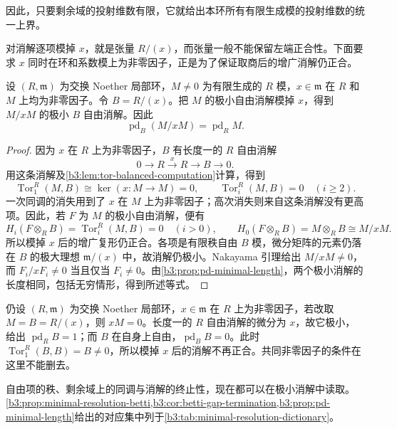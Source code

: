 因此，只要剩余域的投射维数有限，它就给出本环所有有限生成模的投射维数的统一上界。

\ProseParagraphBreak
对消解逐项模掉 \(x\)，就是张量 \(R/(x)\)，而张量一般不能保留左端正合性。下面要求 \(x\) 同时在环和系数模上为非零因子，正是为了保证取商后的增广消解仍正合。

\begin{lemma}\label{b3:lem:regular-element-resolution-basechange}
	设 \((R,\mathfrak m)\) 为交换 Noether 局部环，\(M\ne0\) 为有限生成的 \(R\) 模，\(x\in\mathfrak m\) 在 \(R\) 和 \(M\) 上均为非零因子。令 \(B=R/(x)\)。把 \(M\) 的极小自由消解模掉 \(x\)，得到 \(M/xM\) 的极小 \(B\) 自由消解。因此
	\[
		\operatorname{pd}_B(M/xM)=\operatorname{pd}_RM.
	\]
\end{lemma}
\begin{proof}
	因为 \(x\) 在 \(R\) 上为非零因子，\(B\) 有长度一的 \(R\) 自由消解
	\[
		0\longrightarrow R\xrightarrow{x}R\longrightarrow B\longrightarrow0.
	\]
	用这条消解及\cref{b3:lem:tor-balanced-computation}计算，得到
	\[
		\operatorname{Tor}_1^R(M,B)\cong\ker(x:M\rightarrow M)=0, \qquad \operatorname{Tor}_i^R(M,B)=0\quad(i\ge2).
	\]
	一次同调的消失用到了 \(x\) 在 \(M\) 上为非零因子；高次消失则来自这条消解没有更高项。因此，若 \(F\) 为 \(M\) 的极小自由消解，便有
	\[
		H_i(F\otimes_RB)=\operatorname{Tor}_i^R(M,B)=0\quad(i>0), \qquad H_0(F\otimes_RB)=M\otimes_RB\cong M/xM.
	\]
	所以模掉 \(x\) 后的增广复形仍正合。各项是有限秩自由 \(B\) 模，微分矩阵的元素仍落在 \(B\) 的极大理想 \(\mathfrak m/(x)\) 中，故消解仍极小。Nakayama 引理给出 \(M/xM\ne0\)，而 \(F_i/xF_i\ne0\) 当且仅当 \(F_i\ne0\)。由\cref{b3:prop:pd-minimal-length}，两个极小消解的长度相同，包括无穷情形，得到所述等式。
\end{proof}

仍设 \((R,\mathfrak m)\) 为交换 Noether 局部环，\(x\in\mathfrak m\) 在 \(R\) 上为非零因子，若改取 \(M=B=R/(x)\)，则 \(xM=0\)。长度一的 \(R\) 自由消解的微分为 \(x\)，故它极小，给出 \(\operatorname{pd}_RB=1\)；而 \(B\) 在自身上自由，\(\operatorname{pd}_BB=0\)。此时 \(\operatorname{Tor}_1^R(B,B)=B\ne0\)，所以模掉 \(x\) 后的消解不再正合。共同非零因子的条件在这里不能删去。

\ProseParagraphBreak
自由项的秩、剩余域上的同调与消解的终止性，现在都可以在极小消解中读取。\cref{b3:prop:minimal-resolution-betti,b3:cor:betti-gap-termination,b3:prop:pd-minimal-length}给出的对应集中列于\cref{b3:tab:minimal-resolution-dictionary}。


